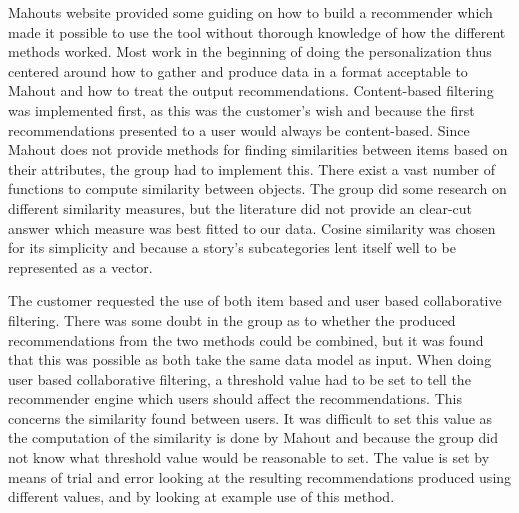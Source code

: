 Mahouts website provided some guiding on how to build a recommender which made it possible to use the tool without thorough knowledge of how the different methods worked. Most work in the beginning of doing the personalization thus centered around how to gather and produce data in a format acceptable to Mahout and how to treat the output recommendations. Content-based filtering was implemented first, as this was the customer's wish and because the first recommendations presented to a user would always be content-based. Since Mahout does not provide methods for finding similarities between items based on their attributes, the group had to implement this. There exist a vast number of functions to compute similarity between objects. The group did some research on different similarity measures, but the literature did not provide an clear-cut answer which measure was best fitted to our data. Cosine similarity was chosen for its simplicity and because a story's subcategories lent itself well to be represented as a vector.\newline

The customer requested the use of both item based and user based collaborative filtering. There was some doubt in the group as to whether the produced recommendations from the two methods could be combined, but it was found that this was possible as both take the same data model as input. When doing user based collaborative filtering, a threshold value had to be set to tell the recommender engine which users should affect the recommendations. This concerns the similarity found between users. It was difficult to set this value as the computation of the similarity is done by Mahout and because the group did not know what threshold value would be reasonable to set. The value is set by means of trial and error looking at the resulting recommendations produced using different values, and by looking at example use of this method. 


\cleardoublepage